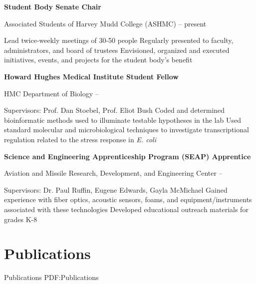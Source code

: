 \documentclass[letterpaper,10pt,oneside]{article}
\begin{document}
\begin{body}
\BigGap

{\textbf{Student Body Senate Chair}}

\GapNoBreak
\BulletItem
Associated Students of Harvey Mudd College (ASHMC)
\hfill
{} --
present
\begin{detail}
\SubBulletItemBullet
Lead twice-weekly meetings of 30-50 people
\SubBulletItemBullet
Regularly presented to faculty, administrators, and board of trustees
\SubBulletItemBullet
Envisioned, organized and executed initiatives, events, and projects for the student body's benefit
\end{detail}

\BigGap

{\textbf{Howard Hughes Medical Institute Student Fellow}}

\GapNoBreak
\BulletItem
HMC Department of Biology
\hfill
{} --
\begin{detail}
\SubBulletItem
Supervisors:
Prof. Dan Stoebel, Prof. Eliot Bush
\SubBulletItemBullet
Coded and determined bioinformatic methods used to illuminate testable hypotheses in the  lab
\SubBulletItemBullet
Used standard molecular and microbiological techniques to investigate transcriptional regulation related to the stress response in {\it E. coli}
\end{detail}

\BigGap

{\textbf{Science and Engineering Apprenticeship Program (SEAP) Apprentice}}

\GapNoBreak
\BulletItem
Aviation and Missile Research, Development, and Engineering Center \hfill
{} --
\begin{detail}
\SubBulletItem
Supervisors:
Dr. Paul Ruffin, Eugene Edwards, Gayla McMichael
\SubBulletItemBullet
Gained experience with fiber optics, acoustic sensors, foams, and equipment/instruments associated with these technologies
\SubBulletItemBullet
Developed educational outreach materials for grades K-8
\end{detail}


\section
{Publications}
{Publications}
{PDF:Publications}


\end{body}
\end{document}
